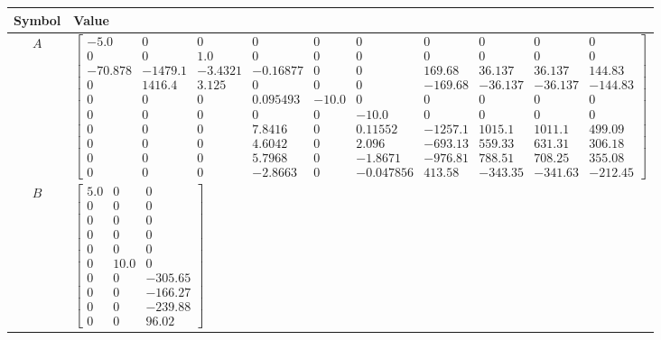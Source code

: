 \begin{tabular}{cl}
\hline
  Symbol  & Value                                                                                                                                                                                                                                                                                                                                                                                                                                                                                                                                                                                                                                                                              \\
\hline
   $A$    & $\left[\begin{matrix}-5.0 & 0 & 0 & 0 & 0 & 0 & 0 & 0 & 0 & 0\\0 & 0 & 1.0 & 0 & 0 & 0 & 0 & 0 & 0 & 0\\-70.878 & -1479.1 & -3.4321 & -0.16877 & 0 & 0 & 169.68 & 36.137 & 36.137 & 144.83\\0 & 1416.4 & 3.125 & 0 & 0 & 0 & -169.68 & -36.137 & -36.137 & -144.83\\0 & 0 & 0 & 0.095493 & -10.0 & 0 & 0 & 0 & 0 & 0\\0 & 0 & 0 & 0 & 0 & -10.0 & 0 & 0 & 0 & 0\\0 & 0 & 0 & 7.8416 & 0 & 0.11552 & -1257.1 & 1015.1 & 1011.1 & 499.09\\0 & 0 & 0 & 4.6042 & 0 & 2.096 & -693.13 & 559.33 & 631.31 & 306.18\\0 & 0 & 0 & 5.7968 & 0 & -1.8671 & -976.81 & 788.51 & 708.25 & 355.08\\0 & 0 & 0 & -2.8663 & 0 & -0.047856 & 413.58 & -343.35 & -341.63 & -212.45\end{matrix}\right]$ \\
   $B$    & $\left[\begin{matrix}5.0 & 0 & 0\\0 & 0 & 0\\0 & 0 & 0\\0 & 0 & 0\\0 & 0 & 0\\0 & 10.0 & 0\\0 & 0 & -305.65\\0 & 0 & -166.27\\0 & 0 & -239.88\\0 & 0 & 96.02\end{matrix}\right]$                                                                                                                                                                                                                                                                                                                                                                                                                                                                                                   \\

\end{tabular}
